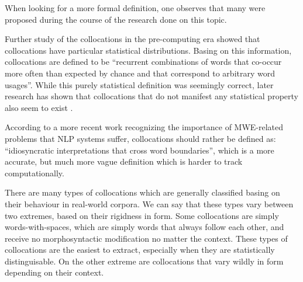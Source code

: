 \documentclass[a4paper,12pt,oneside]{article}
\begin{document}
When looking for a more formal definition, one observes that many were proposed during the course of the research done on this topic.

Further study of the collocations in the pre-computing era showed that collocations have particular statistical distributions\cite{smadja93}.
Basing on this information, collocations are defined to be ``recurrent combinations of words that co-occur more often than expected by chance and that correspond to arbitrary word usages''.
While this purely statistical definition was seemingly correct, later research has shown that collocations that do not manifest any statistical property also seem to exist \cite{1118854}.

According to a more recent work\cite{sag02multiword} recognizing the importance of MWE-related problems that NLP systems suffer, collocations should rather be defined as: ``idiosyncratic interpretations that cross word boundaries'', which is a more accurate, but much more vague definition which is harder to track computationally. 

There are many types of collocations which are generally classified basing on their behaviour in real-world corpora. We can say that these types vary between two extremes, based on their rigidness in form. Some collocations are simply words-with-spaces, which are simply words that always follow each other, and receive no morphosyntactic modification no matter the context. These types of collocations are the easiest to extract, especially when they are statistically distinguisable. On the other extreme are collocations that vary wildly in form depending on their context.
\end{document}
